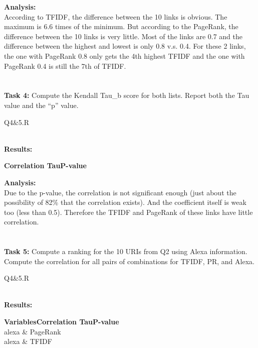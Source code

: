 \documentclass{article}
\begin{document}
		\noindent\textbf{Analysis:}\\
		\indent According to TFIDF, the difference between the 10 links is obvious. The maximum is 6.6 times of the minimum. But according to the PageRank, the difference between the 10 links is very little. Most of the links are 0.7 and the difference between the highest and lowest is only 0.8 v.s. 0.4. For these 2 links, the one with PageRank 0.8 only gets the 4th highest TFIDF and the one with PageRank 0.4 is still the 7th of TFIDF.\\\\\\
		\textbf{Task 4: }Compute the Kendall Tau\_b score for both lists. Report both the Tau value and the ``p'' value.
		\begin{list}{\textbf{R code:}}
			\item Q4\&5.R
		\end{list}
		\noindent\\\textbf{Results:}
		\begin{tabbing}
			\indent\textbf{Correlation Tau}\hspace*{50bp}\=\textbf{P-value}\\
		\end{tabbing}
		\noindent\textbf{Analysis:}\\
		\indent Due to the p-value, the correlation is not significant enough (just about the possibility of 82\% that the correlation exists). And the coefficient itself is weak too (less than 0.5). Therefore the TFIDF and PageRank of these links have little correlation.\\\\\\
		\textbf{Task 5: }Compute a ranking for the 10 URIs from Q2 using Alexa information. Compute the correlation for all pairs of combinations for TFIDF, PR, and Alexa.
		\begin{list}{\textbf{R code:}}
			\item Q4\&5.R
		\end{list}
		\noindent\\\textbf{Results:}
		\begin{tabbing}
			\indent\textbf{Variables}\hspace*{80bp}\=\textbf{Correlation Tau}\hspace*{50bp}\=\textbf{P-value}\\
			\indent alexa \& PageRank  \>0.04162\\
			\indent alexa \& TFIDF  \>0.03602
		\end{tabbing}
\end{document}
